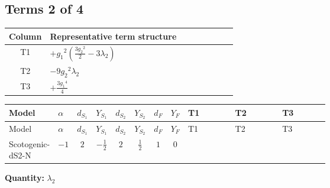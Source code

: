 \documentclass[8pt]{article}
\begin{document}
\begin{landscape}
\subsection*{Terms 2 of 4}
\begin{center}
\begin{tabular}{@{}c >{\raggedright\arraybackslash}p{0.82\linewidth}@{}}
\toprule
Column & Representative term structure \\
\midrule
T1 & \(\displaystyle +{g_1}^2 \left(\frac{3 {g_2}^2}{2}-3 {\lambda_2}\right)\) \\
\midrule
T2 & \(\displaystyle -9 {g_2}^2 {\lambda_2}\) \\
\midrule
T3 & \(\displaystyle +\frac{3 {g_1}^4}{4}\) \\
\midrule
\bottomrule
\end{tabular}
\end{center}
\smallskip
\tiny
\begin{longtable}{@{}llcccccc >{\raggedright\arraybackslash}p{0.21\linewidth} >{\raggedright\arraybackslash}p{0.21\linewidth} >{\raggedright\arraybackslash}p{0.21\linewidth}@{}}
\toprule
Model & $\alpha$ & $d_{S_1}$ & $Y_{S_1}$ & $d_{S_2}$ & $Y_{S_2}$ & $d_F$ & $Y_F$ & T1 & T2 & T3 \\
\midrule
\endfirsthead
\toprule
Model & $\alpha$ & $d_{S_1}$ & $Y_{S_1}$ & $d_{S_2}$ & $Y_{S_2}$ & $d_F$ & $Y_F$ & T1 & T2 & T3 \\
\midrule
\endhead
Scotogenic-dS2-N & $-1$ & $2$ & $-\frac{1}{2}$ & $2$ & $\frac{1}{2}$ & $1$ & $0$ & \scriptsize\adjustbox{max width=\linewidth}{$\begin{gathered} +{g_1}^2 \left(\frac{3 {g_2}^2}{2}-3 {\lambda_2}\right)\end{gathered}$} & \scriptsize\adjustbox{max width=\linewidth}{$\begin{gathered} -9 {g_2}^2 {\lambda_2}\end{gathered}$} & \scriptsize\adjustbox{max width=\linewidth}{$\begin{gathered} +\frac{3 {g_1}^4}{4}\end{gathered}$} \\
\midrule
\bottomrule
\end{longtable}
\clearpage
\noindent\textbf{Quantity: }$\lambda_2$\par\smallskip

\end{landscape}
\end{document}
